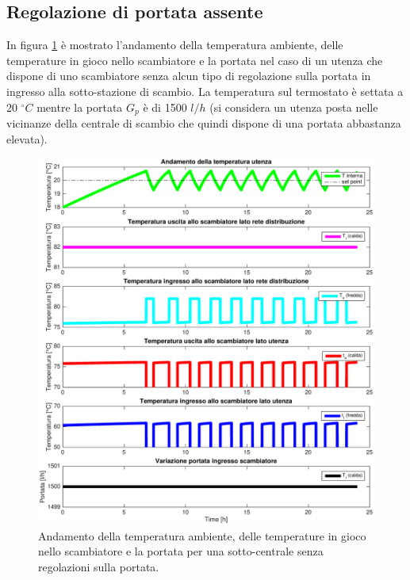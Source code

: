 \documentclass[laurea,oneside,11pt]{USiena_tesiLM}
\begin{document}
\subsection{Regolazione di portata assente}
In figura \ref{fig:no_reg} è mostrato l'andamento della temperatura ambiente, delle temperature in gioco nello scambiatore e la portata nel caso di un utenza che dispone di uno scambiatore senza alcun tipo di regolazione sulla portata in ingresso alla sotto-stazione di scambio. La temperatura sul termostato è settata a 20 $^{\circ}C$ mentre la portata $G_p$ è di 1500 $l/h$ (si considera un utenza posta nelle vicinanze della centrale di scambio che quindi dispone di una portata abbastanza elevata). 

\begin{figure}[!ht]
\centering
\includegraphics[width=\textwidth]{figure/no_reg} 
\caption{Andamento della temperatura ambiente, delle temperature in gioco nello scambiatore e la portata per una sotto-centrale senza regolazioni sulla portata.}
\label{fig:no_reg}
\end{figure}
\end{document}
